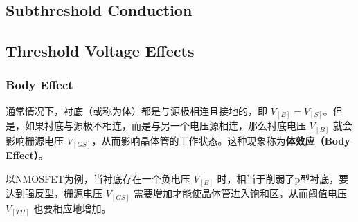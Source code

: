 \subsection{Subthreshold Conduction}

\subsection{Threshold Voltage Effects}
\subsubsection{Body Effect}
通常情况下，衬底（或称为体）都是与源极相连且接地的，即 $V_[B] = V_[S]$。但是，如果衬底与源极不相连，而是与另一个电压源相连，那么衬底电压 $V_[B]$ 就会影响栅源电压 $V_[GS]$，从而影响晶体管的工作状态。这种现象称为\textbf{体效应（Body Effect）}。

以NMOSFET为例，当衬底存在一个负电压 $V_[B]$ 时，相当于削弱了p型衬底，要达到强反型，栅源电压 $V_[GS]$ 需要增加才能使晶体管进入饱和区，从而阈值电压 $V_[TH]$ 也要相应地增加。

